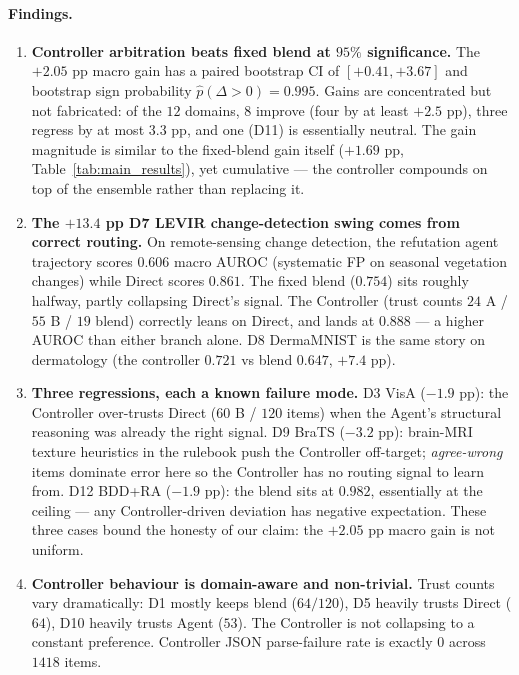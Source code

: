 \paragraph{Findings.}

\begin{enumerate}
\item \textbf{Controller arbitration beats fixed blend at $95\%$
significance.} The $+2.05$ pp macro gain has a paired bootstrap
CI of $[+0.41, +3.67]$ and bootstrap sign probability $\hat p(\Delta{>}0) =
0.995$. Gains are concentrated but not fabricated: of the $12$
domains, $8$ improve (four by at least $+2.5$ pp), three regress by
at most $3.3$ pp, and one (D11) is essentially neutral. The gain
magnitude is similar to the fixed-blend gain itself ($+1.69$ pp,
Table~\ref{tab:main_results}), yet cumulative --- the controller compounds on top
of the ensemble rather than replacing it.

\item \textbf{The $+13.4$ pp D7 LEVIR change-detection swing comes
from correct routing.} On remote-sensing change detection, the refutation agent
trajectory scores $0.606$ macro AUROC (systematic FP on seasonal
vegetation changes) while Direct scores $0.861$. The fixed blend
($0.754$) sits roughly halfway, partly collapsing Direct's signal.
The Controller (trust counts $24$ A / $55$ B / $19$ blend) correctly
leans on Direct, and lands at $0.888$ --- a higher AUROC than either
branch alone. D8 DermaMNIST is the same story on dermatology
(the controller $0.721$ vs blend $0.647$, $+7.4$ pp).

\item \textbf{Three regressions, each a known failure mode.}
D3 VisA ($-1.9$ pp): the Controller over-trusts Direct ($60$ B /
$120$ items) when the Agent's structural reasoning was already the
right signal. D9 BraTS ($-3.2$ pp): brain-MRI texture heuristics in
the rulebook push the Controller off-target; \textit{agree-wrong}
items dominate error here so the Controller has no routing signal
to learn from. D12 BDD+RA ($-1.9$ pp): the blend sits at $0.982$,
essentially at the ceiling --- any Controller-driven deviation has
negative expectation. These three cases bound the
honesty of our claim: the $+2.05$ pp macro gain is not uniform.

\item \textbf{Controller behaviour is domain-aware and
non-trivial.} Trust counts vary dramatically: D1 mostly keeps blend
($64/120$), D5 heavily trusts Direct ($64$), D10 heavily trusts
Agent ($53$). The Controller is not collapsing to a constant
preference. Controller JSON parse-failure rate is exactly $0$
across $1418$ items.


\end{enumerate}
